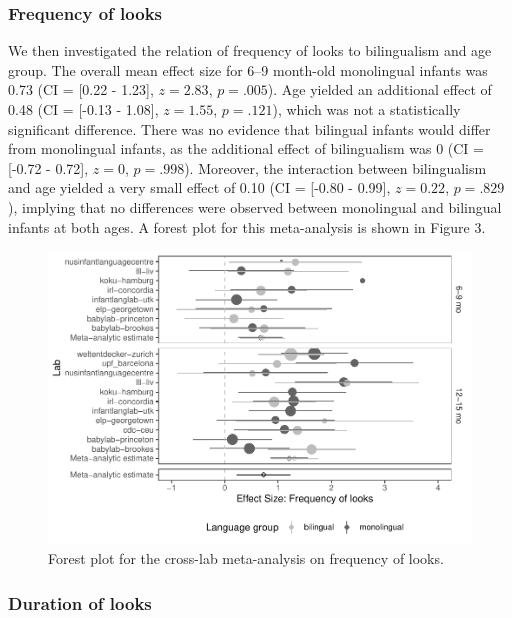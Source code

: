 \documentclass[,man,floatsintext]{apa6}
\begin{document}
\hypertarget{frequency-of-looks-1}{%
\subsubsection{Frequency of looks}\label{frequency-of-looks-1}}

We then investigated the relation of frequency of looks to bilingualism and age group. The overall mean effect size for 6--9 month-old monolingual infants was 0.73 (CI = {[}0.22 - 1.23{]}, \(z = 2.83\), \(p = .005\)). Age yielded an additional effect of 0.48 (CI = {[}-0.13 - 1.08{]}, \(z = 1.55\), \(p = .121\)), which was not a statistically significant difference. There was no evidence that bilingual infants would differ from monolingual infants, as the additional effect of bilingualism was 0 (CI = {[}-0.72 - 0.72{]}, \(z = 0\), \(p = .998\)). Moreover, the interaction between bilingualism and age yielded a very small effect of 0.10 (CI = {[}-0.80 - 0.99{]}, \(z = 0.22\), \(p = .829\)), implying that no differences were observed between monolingual and bilingual infants at both ages. A forest plot for this meta-analysis is shown in Figure 3.

\begin{figure}
\centering
\includegraphics{gaze-following-paper_files/figure-latex/fig3-1.pdf}
\caption{\label{fig:fig3}Forest plot for the cross-lab meta-analysis on frequency of looks.}
\end{figure}

\hypertarget{duration-of-looks-1}{%
\subsubsection{Duration of looks}\label{duration-of-looks-1}}
\end{document}
